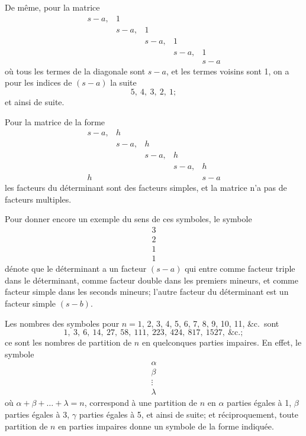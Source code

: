\documentclass[12pt,a4paper]{article}
\begin{document}
De m\^{e}me, pour la matrice
\[
\begin{matrix}
s-a, & 1 & & & \\
& s-a, & 1 & & \\
& & s-a, & 1 & \\
& & & s-a, & 1 \\
& & & & s-a
\end{matrix}
\]
o\`{u} tous les termes de la diagonale sont $s-a$, et les termes voisins sont 1, on a pour les indices de $(s-a)$ la suite
\[
5,\ 4,\ 3,\ 2,\ 1;
\]
et ainsi de suite.

Pour la matrice de la forme
\[
\begin{matrix}
s-a, & h & & & \\
& s-a, & h & & \\
& & s-a, & h & \\
& & & s-a, & h \\
h & & & & s-a
\end{matrix}
\]
les facteurs du d\'{e}terminant sont des facteurs simples, et la matrice n'a pas de facteurs multiples.

\newpage
\setcounter{page}{219}

Pour donner encore un exemple du sens de ces symboles, le symbole
\[
\begin{array}{c}
3 \\
2 \\
1 \\
1
\end{array}
\]
d\'{e}note que le d\'{e}terminant a un facteur $(s-a)$ qui entre comme facteur triple dans le d\'{e}terminant, comme facteur double dans les premiers mineurs, et comme facteur simple dans les seconds mineurs; l'autre facteur du d\'{e}terminant est un facteur simple $(s-b)$.

Les nombres des symboles pour $n = 1$, 2, 3, 4, 5, 6, 7, 8, 9, 10, 11, \&c.\ sont
\[
1,\ 3,\ 6,\ 14,\ 27,\ 58,\ 111,\ 223,\ 424,\ 817,\ 1527,\ \text{\&c.};
\]
ce sont les nombres de partition de $n$ en quelconques parties impaires. En effet, le symbole
\[
\begin{array}{c}
\alpha \\
\beta \\
\vdots \\
\lambda
\end{array}
\]
o\`{u} $\alpha + \beta + \ldots + \lambda = n$, correspond \`{a} une partition de $n$ en $\alpha$ parties \'{e}gales \`{a} 1, $\beta$ parties \'{e}gales \`{a} 3, $\gamma$ parties \'{e}gales \`{a} 5, et ainsi de suite; et r\'{e}ciproquement, toute partition de $n$ en parties impaires donne un symbole de la forme indiqu\'{e}e.
\end{document}
